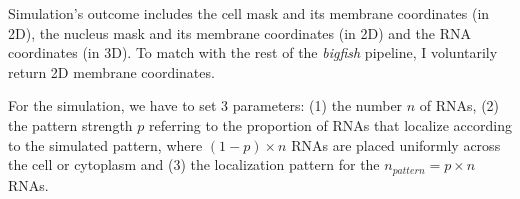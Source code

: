Simulation's outcome includes the cell mask and its membrane coordinates (in 2D), the nucleus mask and its membrane coordinates (in 2D) and the \ac{RNA} coordinates (in 3D).
To match with the rest of the \emph{bigfish} pipeline, I voluntarily return 2D membrane coordinates.

For the simulation, we have to set 3 parameters: (1) the number $n$ of \ac{RNA}s, (2) the pattern strength $p$ referring to the proportion of \ac{RNA}s that localize according to the simulated pattern, where $(1-p) \times n$ \ac{RNA}s are placed uniformly across the cell or cytoplasm and (3) the localization pattern for the $n_{pattern} = p \times n$ \ac{RNA}s. 


